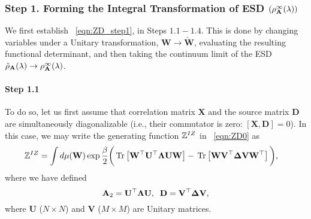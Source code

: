 \subsubsection{Step 1. Forming the Integral Transformation of ESD $(\rho_{\mathbf{A}}^{\infty}(\lambda))$}
\label{sxn:tanaka_step1}
We first establish \EQN~\ref{eqn:ZD_step1}, in Steps $1.1-1.4$.
This is done by changing variables under a Unitary transformation, $\mathbf{W}\rightarrow\mathbf{\check{W}}$,
evaluating the resulting functional determinant,
and then taking the continuum limit of the ESD
$\tilde{\rho}_{\mathbf{A}}(\lambda)\rightarrow\rho^{\infty}_{\mathbf{A}}(\lambda)$.

\paragraph{Step 1.1}
To do so, let us first assume that \Teacher correlation matrix $\mathbf{X}$ and the source matrix $\mathbf{D}$
are simultaneously diagonalizable  
(i.e., their commutator is zero: $[\mathbf{X}, \mathbf{D}]=0$).
In this case, we may write the generating function $\mathbb{Z}^{IZ}$ in \EQN~\ref{eqn:ZD0} as
%
\begin{align}
\label{eqn:Z-diag}
\mathbb{Z}^{IZ} &= \int d\mu(\mathbf{W}) \exp\frac{\beta}{2}
 \bigg( 
\mbox{}\operatorname{Tr}\left[\mathbf{W}^{\top}\mathbf{U}^{\top}\mathbf{\Lambda}\mathbf{U}\mathbf{W}\right] 
- \mbox{}\operatorname{Tr}\left[\mathbf{W}\mathbf{V}^{\top}\mathbf{\Delta}\mathbf{V}\mathbf{W}^{\top}\right] 
\bigg)  ,
\end{align}
where we have defined
%
\begin{equation}
\label{eqn:diag-A-D}
    \mathbf{A}_{2}=\mathbf{U}^{\top}\mathbf{\Lambda}\mathbf{U},\;\;
    \mathbf{D}=\mathbf{V}^{\top}\mathbf{\Delta}\mathbf{V}  ,
\end{equation}
%
where $\mathbf{U}$ ($N\times N$) and $\mathbf{V}$ ($M\times M$) are Unitary matrices.
%

